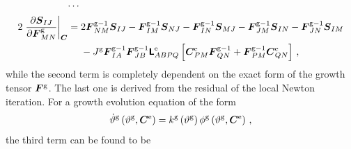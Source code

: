 \documentclass[10pt,letterpaper,oneside]{report}
\newcommand{\ten}[1]{\mbox{\boldmath $#1$}{}}
\newcommand{\tenf}[1]{\mbox{{\sffamily{\bfseries {#1}}}}}
\newcommand{\scas}[1]{\mbox{{\scriptsize{${\rm{#1}}$}}}{}}
\newcommand{\tens}[1]{\mbox{\boldmath{\scriptsize{$#1$}}}{}}
\begin{document}
\begin{align}
\cdots{}& \notag \\
2 \left. \frac{\partial \ten{S}_{IJ}}{\partial \ten{F}^{\scas{g}}_{MN}} \right|_{\tens{C}} 
={}& 2 \ten{F}^{\scas{g}-1}_{NM} \ten{S}_{IJ} 
- \ten{F}^{\scas{g}-1}_{IM} \ten{S}_{NJ} - \ten{F}^{\scas{g}-1}_{IN} \ten{S}_{MJ} - \ten{F}^{\scas{g}-1}_{JM} \ten{S}_{IN} - \ten{F}^{\scas{g}-1}_{JN} \ten{S}_{IM} \notag \\
& - J^{\scas{g}} \ten{F}^{\scas{g}-1}_{IA} \ten{F}^{\scas{g}-1}_{JB} \tenf{L}^{\scas{e}}_{ABPQ} \left[ \ten{C}^{\scas{e}}_{PM} \ten{F}^{\scas{g}-1}_{QN} + \ten{F}^{\scas{g}-1}_{PM} \ten{C}^{\scas{e}}_{QN} \right] \, ,
\label{dSdFg}
\end{align}
while the second term is completely dependent on the exact form of the growth tensor $\ten{F}^{\scas{g}}$.  The last one is derived from the residual of the local Newton iteration.  For a growth evolution equation of the form 
\begin{equation}
\dot{\vartheta}^{\scas{g}} \left( \vartheta^{\scas{g}}, \ten{C}^{\scas{e}} \right) = k^{\scas{g}} \left( \vartheta^{\scas{g}} \right) \phi^{\scas{g}} \left( \vartheta^{\scas{g}}, \ten{C}^{\scas{e}} \right) \, , 
\end{equation}
the third term can be found to be
\end{document}
